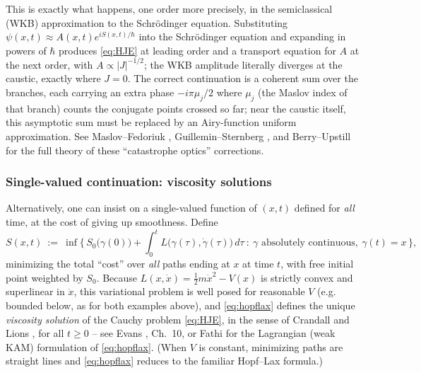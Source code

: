This is exactly what happens, one order more precisely, in the semiclassical
(WKB) approximation to the Schr\"odinger equation. Substituting
$\psi(x,t)\approx A(x,t)e^{iS(x,t)/\hbar}$ into the Schr\"odinger equation and
expanding in powers of $\hbar$ produces \eqref{eq:HJE} at leading order and a
transport equation for $A$ at the next order, with $A\propto |J|^{-1/2}$; the
WKB amplitude literally diverges at the caustic, exactly where $J=0$. The
correct continuation is a coherent sum over the branches, each carrying an
extra phase $-i\pi\mu_j/2$ where $\mu_j$ (the Maslov index of that branch)
counts the conjugate points crossed so far; near the caustic itself, this
asymptotic sum must be replaced by an Airy-function uniform approximation. See
Maslov--Fedoriuk \cite{MaslovFedoriuk}, Guillemin--Sternberg
\cite{GuilleminSternberg}, and Berry--Upstill \cite{BerryUpstill} for the full
theory of these ``catastrophe optics'' corrections.

\subsubsection{Single-valued continuation: viscosity solutions}
\label{sec:viscosity}

Alternatively, one can insist on a single-valued function of $(x,t)$ defined
for \emph{all} time, at the cost of giving up smoothness. Define
\begin{equation}
S(x,t) \ :=\ \inf\Big\{\, S_0\big(\gamma(0)\big) + \int_0^tL\big(\gamma(\tau),\dot\gamma(\tau)\big)\,d\tau \ :\ \gamma \text{ absolutely continuous}, \ \gamma(t)=x \,\Big\},
\label{eq:hopflax}
\end{equation}
minimizing the total ``cost'' over \emph{all} paths ending at $x$ at time $t$,
with free initial point weighted by $S_0$. Because $L(x,\dot x)=\tfrac12m\dot
x^2-V(x)$ is strictly convex and superlinear in $\dot x$, this variational
problem is well posed for reasonable $V$ (e.g. bounded below, as for both
examples above), and \eqref{eq:hopflax} defines the unique \emph{viscosity
solution} of the Cauchy problem \eqref{eq:HJE}, in the sense of Crandall and
Lions \cite{CrandallLions}, for all $t\ge 0$ -- see Evans \cite{Evans}, Ch.~10,
or Fathi \cite{Fathi} for the Lagrangian (weak KAM) formulation of
\eqref{eq:hopflax}. (When $V$ is constant, minimizing paths are straight lines
and \eqref{eq:hopflax} reduces to the familiar Hopf--Lax formula.)


